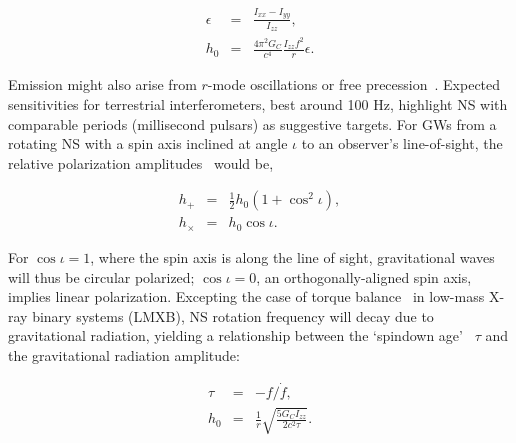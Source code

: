         \begin{eqnarray}
        \epsilon &=& \frac{I_{xx} - I_{yy}}{I_{zz}}, \\
        h_0 &=& \frac{4 \pi^2 G_C}{c^4} \frac{I_{zz} f^2}{r} \epsilon.
        \label{cw_radiation_eps_eq}
        \end{eqnarray}

Emission might also arise from $r$-mode oscillations or free precession~\cite{Shawhan2010}.
Expected sensitivities for terrestrial interferometers, best around 100 Hz, highlight NS with comparable periods (millisecond pulsars) as suggestive targets.
For GWs from a rotating NS with a spin axis inclined at angle $\iota$ to an observer's line-of-sight, the relative polarization amplitudes~\cite{DergachevThesis} would be,

\begin{eqnarray} 
h_+ &=& \tfrac{1}{2} h_0 (1 + \cos^2 \iota),\\
h_\times &=& h_0 \cos \iota.
\end{eqnarray}

For $\cos \iota = 1$, where the spin axis is along the line of sight, gravitational waves will thus be circular polarized; $\cos \iota = 0$, an orthogonally-aligned spin axis, implies linear polarization.
Excepting the case of torque balance~\cite{PapaloizouPringle1978,Wagoner1984} in low-mass X-ray binary systems (LMXB), NS rotation frequency will decay due to gravitational radiation, yielding a relationship between the `spindown age'~\cite{Brady1998} $\tau$ and the gravitational radiation amplitude:

        \begin{eqnarray}
        \tau &=& -f / \dot{f}, \\
        h_0 &=& \frac{1}{r} \sqrt{\frac{5 G_C I_{zz}}{2 c^2 \tau}}.
        \end{eqnarray}


